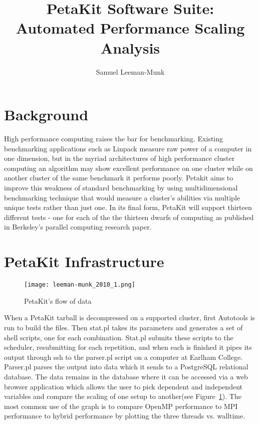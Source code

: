 \documentclass[12pt]{article}
\begin{document}
\title{PetaKit Software Suite:\\Automated Performance Scaling Analysis}
\author{ Samuel Leeman-Munk }
\maketitle
{}
\tableofcontents
\section{Background}
High performance computing raises the bar for benchmarking. Existing benchmarking applications such as Linpack\cite{Linpack} measure raw power of a computer in one dimension, but in the myriad architectures of high performance cluster computing an algorithm may show excellent performance on one cluster while on another cluster of the same benchmark it performs poorly.
Petakit aims to improve this weakness of standard benchmarking by using multidimensional benchmarking technique that would measure a cluster's abilities via multiple unique tests rather than just one. In its final form, PetaKit will support thirteen different tests - one for each of the the  thirteen dwarfs of computing as published in Berkeley's parallel computing research paper\cite{Dwarfs}. 
\section{PetaKit Infrastructure}
\begin{figure}
\centering

\texttt{[image: leeman-munk\_2010\_1.png]}

\caption{PetaKit's flow of data\cite{PetaKit}}

\label{fig:dataflow}

\end{figure}
When a PetaKit tarball is decompressed on a supported cluster, first Autotools is run to build the files. Then stat.pl takes its parameters and generates a set of shell scripts, one for each combination. Stat.pl submits these scripts to the scheduler, resubmitting for each repetition, and when each is finished it pipes its output through ssh to the parser.pl script on a computer at Earlham College. Parser.pl parses the output into data which it sends to a PostgreSQL relational database. The data remains in the database where it can be accessed via a web browser application which allows the user to pick dependent and independent variables and compare the scaling of one setup to another(see Figure~\ref{fig:dataflow}). The most common use of the graph is to compare OpenMP performance to MPI performance to hybrid performance by plotting the three threads vs. walltime.
\end{document}
